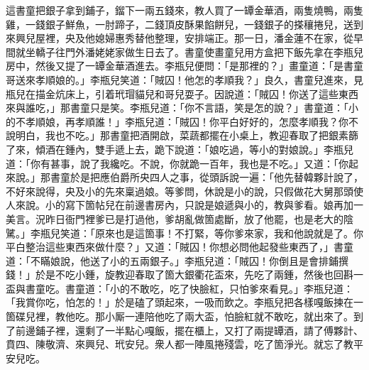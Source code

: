 這書童把銀子拿到鋪子，鎦下一兩五錢來，教人買了一罈金華酒，兩隻燒鴨，兩隻雞，一錢銀子鮮魚，一肘蹄子，二錢頂皮酥果餡餅兒，一錢銀子的搽穰捲兒，送到來興兒屋裡，央及他媳婦惠秀替他整理，安排端正。那一日，潘金蓮不在家，從早間就坐轎子往門外潘姥姥家做生日去了。書童使畫童兒用方盒把下飯先拿在李瓶兒房中，然後又提了一罈金華酒進去。李瓶兒便問：「是那裡的？」畫童道：「是書童哥送來孝順娘的。」李瓶兒笑道：「賊囚！他怎的孝順我？」良久，書童兒進來，見瓶兒在描金炕床上，引着玳瑁貓兒和哥兒耍子。因說道：「賊囚！你送了這些東西來與誰吃，」那書童只是笑。李瓶兒道：「你不言語，笑是怎的說？」書童道：「小的不孝順娘，再孝順誰！」{}李瓶兒道：「賊囚！你平白好好的，怎麼孝順我？你不說明白，我也不吃。」那書童把酒開啟，菜蔬都擺在小桌上，教迎春取了把銀素篩了來，傾酒在鍾內，雙手遞上去，跪下說道：「娘吃過，等小的對娘說。」李瓶兒道：「你有甚事，說了我纔吃。不說，你就跪一百年，我也是不吃。」又道：「你起來說。」那書童於是把應伯爵所央四人之事，從頭訴說一遍：「他先替韓夥計說了，不好來說得，央及小的先來稟過娘。等爹問，休說是小的說，只假做花大舅那頭使人來說。小的寫下箇帖兒在前邊書房內，只說是娘遞與小的，教與爹看。娘再加一美言。況昨日衙門裡爹已是打過他，爹胡亂做箇處斷，放了他罷，也是老大的陰騭。」李瓶兒笑道：「原來也是這箇事！不打緊，等你爹來家，我和他說就是了。你平白整治這些東西來做什麼？」又道：「賊囚！你想必問他起發些東西了，」書童道：「不瞞娘說，他送了小的五兩銀子。」李瓶兒道：「賊囚！你倒且是會排鋪撰錢！」於是不吃小鍾，旋教迎春取了箇大銀衢花盃來，先吃了兩鍾，然後也回斟一盃與書童吃。書童道：「小的不敢吃，吃了快臉紅，只怕爹來看見。」李瓶兒道：「我賞你吃，怕怎的！」於是磕了頭起來，一吸而飲之。李瓶兒把各樣嘎飯揀在一箇碟兒裡，教他吃。那小厮一連陪他吃了兩大盃，怕臉紅就不敢吃，就出來了。到了前邊鋪子裡，還剩了一半點心嘎飯，擺在櫃上，又打了兩提罈酒，請了傅夥計、賁四、陳敬濟、來興兒、玳安兒。衆人都一陣風捲殘雲，吃了箇淨光。就忘了教平安兒吃。


